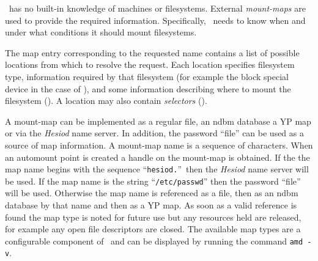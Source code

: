 %
%
%
%



\Amd\ has no built-in knowledge of machines or filesystems.
External {\em mount-maps} are used to provide the required information.
Specifically, \amd\ needs to know when and under what conditions it should
mount filesystems.

The map entry corresponding to the requested name contains
a list of possible locations from which to resolve the request.
Each location specifies  filesystem type, information required by that
filesystem (for example the block special device in the case of \UFS), and
some information describing where to mount the filesystem (\see {}).
A location may also contain {\em selectors} (\see {}).


A mount-map can be implemented as a regular file, an ndbm database
a YP map \cite{sun:yp} or via
the {\em Hesiod} \cite{mit:hesiod} name
server.
In addition, the password ``file'' can be used as a source of
map information.
A mount-map name is a sequence of characters.
When an automount point is created a handle on the mount-map
is obtained.  If the the map name begins with the sequence
``{\tt hesiod.}''\ then the {\em Hesiod} name server will be used.
If the map name is the string ``{\tt /etc/passwd}'' then the password
``file'' will be used.
Otherwise the map name is referenced as a file,
then as an ndbm database by that name and then as a YP map.
As soon as a valid reference is found the map type is noted
for future use but any resources held are released, for example
any open file descriptors are closed.
The available map types are a configurable component of \amd\ and
can be displayed by running the command {\tt amd~-v}.

